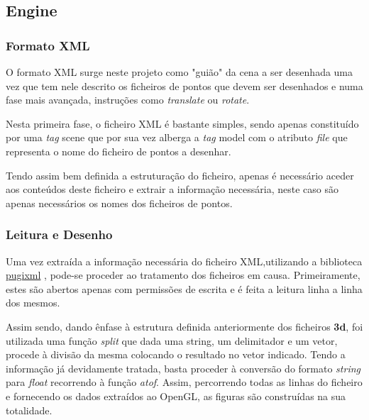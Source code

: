 \documentclass[a4paper]{article}
\begin{document}
\subsection{Engine}

\subsubsection{Formato XML}

\hspace{8mm} O formato XML surge neste projeto como "guião" da cena a ser desenhada uma vez que tem nele descrito os ficheiros de pontos que devem ser desenhados e numa fase mais avançada, instruções como \emph{translate} ou \emph{rotate}.

\hspace{3mm} Nesta primeira fase, o ficheiro XML é bastante simples, sendo apenas constituído por uma \emph{tag} scene que por sua vez alberga a \emph{tag} model com o atributo \emph{file} que representa o nome do ficheiro de pontos a desenhar.

\hspace{3mm} Tendo assim bem definida a estruturação do ficheiro, apenas é necessário aceder aos conteúdos deste ficheiro e extrair a informação necessária, neste caso são apenas necessários os nomes dos ficheiros de pontos.

\subsubsection{Leitura e Desenho}

\hspace{8mm} Uma vez extraída a informação necessária do ficheiro XML,utilizando a biblioteca \href{https://github.com/zeux/pugixml}{pugixml} \cite{pugixml}, pode-se proceder ao tratamento dos ficheiros em causa. Primeiramente, estes são abertos apenas com permissões de escrita e é feita a leitura linha a linha dos mesmos.

\hspace{3mm} Assim sendo, dando ênfase à estrutura definida anteriormente dos ficheiros \textbf{3d}, foi utilizada uma função \emph{split} que dada uma string, um delimitador e um vetor, procede à divisão da mesma colocando o resultado no vetor indicado.
Tendo a informação já devidamente tratada, basta proceder à conversão do formato \emph{string} para \emph{float} recorrendo à função \emph{atof}. Assim, percorrendo todas as linhas do ficheiro e fornecendo os dados extraídos ao OpenGL, as figuras são construídas na sua totalidade.
\end{document}
